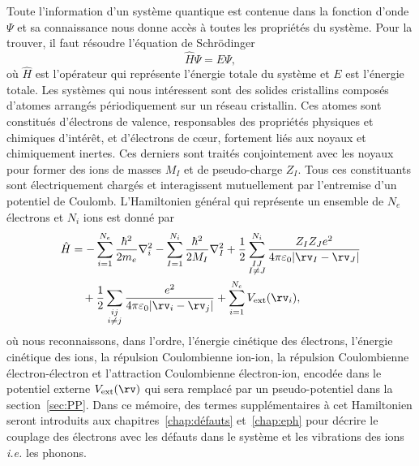 Toute l'information d'un système quantique est contenue dans la fonction d'onde $\Psi$ et sa connaissance nous donne accès à toutes les propriétés du système. Pour la trouver, il faut résoudre l'équation de Schrödinger
\begin{equation}
    \hat{H}\Psi = E\Psi,
\end{equation}
où $\hat{H}$ est l'opérateur qui représente l'énergie totale du système et $E$ est l'énergie totale. Les systèmes qui nous intéressent sont des solides cristallins composés d'atomes arrangés périodiquement sur un réseau cristallin. Ces atomes sont constitués d'électrons de valence, responsables des propriétés physiques et chimiques d'intérêt, et d'électrons de c\oe ur, fortement liés aux noyaux et chimiquement inertes. Ces derniers sont traités conjointement avec les noyaux pour former des ions de masses $M_{I}$ et de pseudo-charge $Z_{I}$. Tous ces constituants sont électriquement chargés et interagissent mutuellement par l'entremise d'un potentiel de Coulomb. L'Hamiltonien général qui représente un ensemble de $N_e$ électrons et $N_i$ ions est donné par
\begin{equation}
\begin{split}
    \hat{H} &= -\sum_{i=1}^{N_e}\frac{\hbar^2}{2m_e}\nabla_i^2
        -\sum_{I=1}^{N_i}\frac{\hbar^2}{2M_I}\nabla_I^2
        +\frac{1}{2}\sum_{\substack{IJ \\ I\neq J}}^{N_i}
        \frac{Z_IZ_Je^2}{4\pi\varepsilon_0|\rv_I-\rv_J|} \\
      &\quad +\frac{1}{2}\sum_{\substack{ij \\ i\neq j}}
        \frac{e^2}{4\pi\varepsilon_0|\rv_i-\rv_j|}+\sum_{i=1}^{N_e}V_\text{ext}(\rv_i),
\end{split}
\label{eqn:c2_H_general}
\end{equation}
où nous reconnaissons, dans l'ordre, l'énergie cinétique des électrons, l'énergie cinétique des ions, la répulsion Coulombienne ion-ion, la répulsion Coulombienne électron-électron et l'attraction Coulombienne électron-ion, encodée dans le potentiel externe $V_\text{ext}(\rv)$ qui sera remplacé par un pseudo-potentiel dans la section~\ref{sec:PP}. Dans ce mémoire, des termes supplémentaires à cet Hamiltonien seront introduits aux chapitres~\ref{chap:défauts} et~\ref{chap:eph} pour décrire le couplage des électrons avec les défauts dans le système et les vibrations des ions \textit{i.e.} les phonons.

